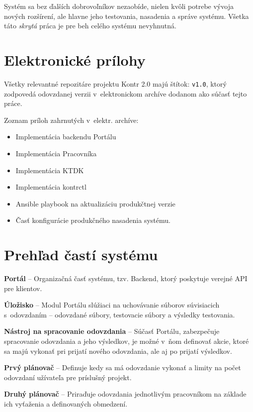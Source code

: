\documentclass[
  digital, %
  oneside, %
  table,   %
  lof,     %
  lot,   %
]{fithesis3}
\begin{document}
Systém sa bez ďalších dobrovoľníkov nezaobíde, nielen kvôli potrebe vývoja nových rozšírení, ale hlavne jeho testovania, nasadenia a správe systému. Všetka táto \emph{skrytá} práca je pre beh celého systému nevyhnutná.


\appendix
\chapter{Elektronické prílohy}
Všetky relevantné repozitáre projektu Kontr 2.0 majú štítok: \texttt{v1.0}, ktorý zodpovedá odovzdanej verzii v~elektronickom archíve dodanom ako súčasť tejto práce.

Zoznam príloh zahrnutých v~elektr. archíve:

\begin{itemize} 
	\item Implementácia backendu Portálu
	\item Implementácia Pracovníka
	\item Implementácia KTDK
	\item Implementácia kontrctl
	\item Ansible playbook na aktualizáciu produkčtnej verzie
    \item Časť konfigurácie produkčného nasadenia systému. 
\end{itemize}

\chapter{Prehľad častí systému}

\hspace{\parindent}\textbf{Portál} -- Organizačná časť systému, tzv. Backend, ktorý poskytuje verejné API pre klientov.

\textbf{Úložisko} -- Modul Portálu slúžiaci na uchovávanie súborov súvisiacich s~odovzdaním -- odovzdané súbory, testovacie súbory a výsledky testovania.

\textbf{Nástroj na spracovanie odovzdania} -- Súčasť Portálu, zabezpečuje spracovanie odovzdania a jeho výsledkov, je možné v~ňom definovať akcie, ktoré sa majú vykonať pri prijatí nového odovzdania, ale aj po prijatí výsledkov.

\textbf{Prvý plánovač} -- Definuje kedy sa má odovzdanie vykonať a limity na počet odovzdaní užívateľa pre príslušný projekt.

\textbf{Druhý plánovač} -- Priraďuje odovzdania jednotlivým pracovníkom na základe ich vyťaženia a definovaných obmedzení.
\end{document}
